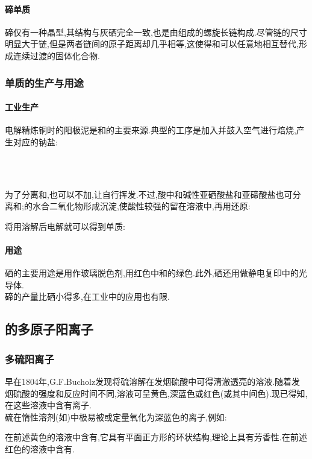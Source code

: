 \documentclass{ctexart}
\begin{document}
\paragraph{碲单质}
碲仅有一种晶型,其结构与灰硒完全一致,也是由组成的螺旋长链构成.尽管链的尺寸明显大于链,但是两者链间的原子距离却几乎相等,这使得和可以任意地相互替代,形成连续过渡的固体化合物.
\subsubsection{单质的生产与用途}
\paragraph{工业生产}
电解精炼铜时的阳极泥是和的主要来源.典型的工序是加入并鼓入空气进行焙烧,产生对应的钠盐:
\begin{center}
    \\
    \\
\end{center}
为了分离和,也可以不加,让自行挥发.不过,酸中和碱性亚硒酸盐和亚碲酸盐也可分离和;的水合二氧化物形成沉淀,使酸性较强的留在溶液中,再用还原:
\begin{center}
\end{center}
将用溶解后电解就可以得到单质:
\begin{center}
\end{center}
\paragraph{用途}
硒的主要用途是用作玻璃脱色剂,用红色中和的绿色.此外,硒还用做静电复印中的光导体.\\
\indent 碲的产量比硒小得多,在工业中的应用也有限.
\subsection{的多原子阳离子}
\subsubsection{多硫阳离子}早在1804年,G.F.Bucholz发现将硫溶解在发烟硫酸中可得清澈透亮的溶液.随着发烟硫酸的强度和反应时间不同,溶液可呈黄色,深蓝色或红色(或其中间色).现已得知,在这些溶液中含有离子.\\
\indent 硫在惰性溶剂(如)中极易被或定量氧化为深蓝色的离子,例如:
\begin{center}
\end{center}
在前述黄色的溶液中含有,它具有平面正方形的环状结构,理论上具有芳香性.在前述红色的溶液中含有.
\end{document}
